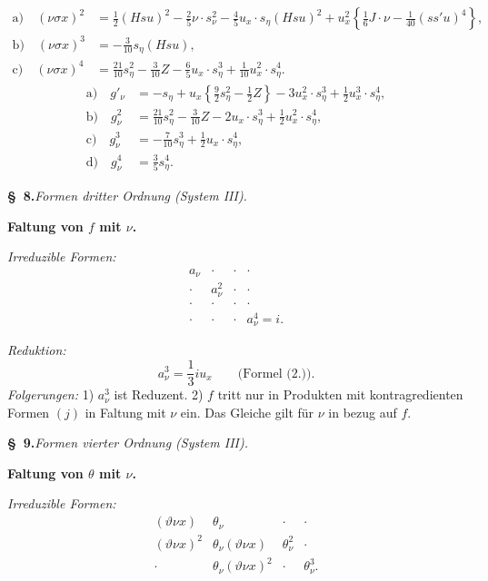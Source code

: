 \[
\tag{7.}
\begin{aligned}
\text{a)}\quad (\nu\sigma x)^2
&=\frac12(Hsu)^2-\frac25\nu\cdot s_\nu^2-\frac45u_x\cdot s_\eta(Hsu)^2+u_x^2\left\{\frac16J\cdot\nu-\frac1{40}(ss'u)^4\right\},\\
\text{b)}\quad (\nu\sigma x)^3&=-\frac3{10}s_\eta(Hsu),\\
\text{c)}\quad (\nu\sigma x)^4&=\frac{21}{10}s_\eta^2-\frac3{10}Z-\frac65u_x\cdot s_\eta^3+\frac1{10}u_x^2\cdot s_\eta^4.
\end{aligned}
\]
\[
\tag{8.}
\begin{aligned}
\text{a)}\quad g'_\nu&=-s_\eta+u_x\left\{\frac92s_\eta^2-\frac12Z\right\}-3u_x^2\cdot s_\eta^3+\frac12u_x^3\cdot s_\eta^4,\\
\text{b)}\quad g_\nu^2&=\frac{21}{10}s_\eta^2-\frac3{10}Z-2u_x\cdot s_\eta^3+\frac12u_x^2\cdot s_\eta^4,\\
\text{c)}\quad g_\nu^3&=-\frac7{10}s_\eta^3+\frac12u_x\cdot s_\eta^4,\\
\text{d)}\quad g_\nu^4&=\frac35s_\eta^4.
\end{aligned}
\]

\begin{center}
\textbf{\S\ 8.}\quad\emph{Formen dritter Ordnung (System III).}
\end{center}

\noindent\textbf{Faltung von $f$ mit $\nu$.}

\noindent\emph{Irreduzible Formen:}
\[
\begin{array}{cccc}
a_\nu&\cdot&\cdot&\cdot\\
\cdot&a_\nu^2&\cdot&\cdot\\
\cdot&\cdot&\cdot&\cdot\\
\cdot&\cdot&\cdot&a_\nu^4=i.
\end{array}
\]

\noindent\emph{Reduktion:}
\[
a_\nu^3=\frac13iu_x\qquad\text{(Formel (2.)).}
\]
\noindent\emph{Folgerungen:} 1) $a_\nu^3$ ist Reduzent. 2) $f$ tritt nur in Produkten mit kontragredienten Formen $(j)$ in Faltung mit $\nu$ ein. Das Gleiche gilt für $\nu$ in bezug auf $f$.

\begin{center}
\textbf{\S\ 9.}\quad\emph{Formen vierter Ordnung (System III).}
\end{center}

\noindent\textbf{Faltung von $\theta$ mit $\nu$.}

\noindent\emph{Irreduzible Formen:}
\[
\begin{array}{cccc}
(\vartheta\nu x)&\theta_\nu&\cdot&\cdot\\
(\vartheta\nu x)^2&\theta_\nu(\vartheta\nu x)&\theta_\nu^2&\cdot\\
\cdot&\theta_\nu(\vartheta\nu x)^2&\cdot&\theta_\nu^3.
\end{array}
\]

